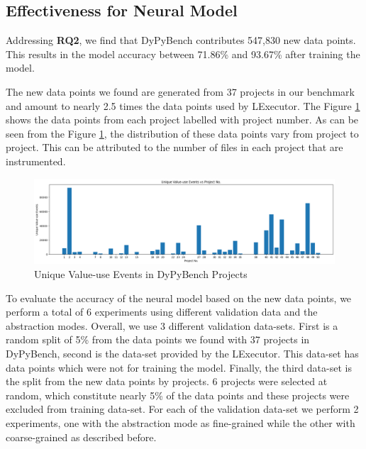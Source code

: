 \subsection{Effectiveness for Neural Model}
Addressing \textbf{RQ2}, we find that DyPyBench contributes 547,830 new data points. 
This results in the model accuracy between 71.86\% and 93.67\% after training the model.

The new data points we found are generated from 37 projects in our benchmark and amount to nearly 2.5 times the data points used by LExecutor.
The Figure \ref{fig:Lex_projects_events} shows the data points from each project labelled with project number.
As can be seen from the Figure \ref{fig:Lex_projects_events}, the distribution of these data points vary from project to project.
This can be attributed to the number of files in each project that are instrumented. 
\begin{figure}[ht]
    \centering
    \includegraphics[width=1\linewidth]{figures/evaluation/lex_data_points.png}
    \caption[Unique Value-use Events]{\label{fig:Lex_projects_events}Unique Value-use Events in DyPyBench Projects}
\end{figure}

To evaluate the accuracy of the neural model based on the new data points, we perform a total of 6 experiments using different validation data and the abstraction modes.
Overall, we use 3 different validation data-sets.
First is a random split of 5\% from the data points we found with 37 projects in DyPyBench, second is the data-set provided by the LExecutor. This data-set has data points which were not for training the model.
Finally, the third data-set is the split from the new data points by projects. 6 projects were selected at random, which constitute nearly 5\% of the data points and these projects were excluded from 
training data-set.
For each of the validation data-set we perform 2 experiments, one with the abstraction mode as fine-grained while the other with coarse-grained as described before.

